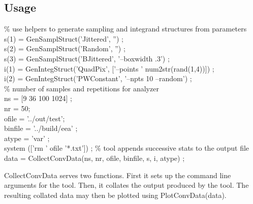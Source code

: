\subsection{Usage}
\begin{tcolorbox}
 \% use helpers to generate sampling and integrand structures from parameters\\
 s(1) = GenSamplStruct('Jittered', '') ; \\
 s(2) = GenSamplStruct('Random', '') ; \\
 s(3) = GenSamplStruct('BJittered', '--boxwidth .3') ; \\
 i(1) = GenIntegStruct('QuadPix', ['--points ' num2str(rand(1,4))]) ; \\
 i(2) = GenIntegStruct('PWConstant', '--npts 10 --random') ; \\
 \% number of samples and repetitions for analyzer \\
 ns = [9 36 100 1024] ;\\
 nr =  50;\\
 ofile = '../out/test';\\
 binfile = '../build/eea' ;\\
 atype = 'var' ;\\
 system (['rm ' ofile '*.txt']) ; \% tool appends successive stats to the output file \\
 data = CollectConvData(ns, nr, ofile, binfile, s, i, atype) ;
\end{tcolorbox}
CollectConvData serves two functions. First it sets up the command line arguments for the tool. Then, it collates the output produced by the tool. The resulting collated data may then be plotted using PlotConvData(data).


